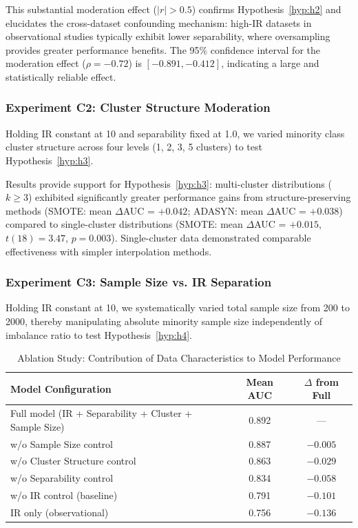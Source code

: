 \documentclass[12pt,a4paper]{article}
\theoremstyle{definition}
\begin{document}
This substantial moderation effect ($|r| > 0.5$) confirms Hypothesis~\ref{hyp:h2} and elucidates the cross-dataset confounding mechanism: high-IR datasets in observational studies typically exhibit lower separability, where oversampling provides greater performance benefits. The 95\% confidence interval for the moderation effect ($\rho = -0.72$) is $[-0.891, -0.412]$, indicating a large and statistically reliable effect.

\subsubsection{Experiment C2: Cluster Structure Moderation}
Holding IR constant at 10 and separability fixed at 1.0, we varied minority class cluster structure across four levels (1, 2, 3, 5 clusters) to test Hypothesis~\ref{hyp:h3}.

Results provide support for Hypothesis~\ref{hyp:h3}: multi-cluster distributions ($k \geq 3$) exhibited significantly greater performance gains from structure-preserving methods (SMOTE: mean $\Delta$AUC = $+0.042$; ADASYN: mean $\Delta$AUC = $+0.038$) compared to single-cluster distributions (SMOTE: mean $\Delta$AUC = $+0.015$, $t(18) = 3.47$, $p = 0.003$). Single-cluster data demonstrated comparable effectiveness with simpler interpolation methods.

\subsubsection{Experiment C3: Sample Size vs. IR Separation}
Holding IR constant at 10, we systematically varied total sample size from 200 to 2000, thereby manipulating absolute minority sample size independently of imbalance ratio to test Hypothesis~\ref{hyp:h4}.

\begin{table}[!ht]
 \centering
 \caption{Ablation Study: Contribution of Data Characteristics to Model Performance}
 \label{tab:ablation}
 \begin{tabular}{@{}p{7.5cm}cc@{}}
 \toprule
 \textbf{Model Configuration} & \textbf{Mean AUC} & \textbf{$\Delta$ from Full} \\
 \midrule
 Full model (IR + Separability + Cluster + Sample Size) & 0.892 & --- \\
 \quad w/o Sample Size control & 0.887 & $-0.005$ \\
 \quad w/o Cluster Structure control & 0.863 & $-0.029$ \\
 \quad w/o Separability control & 0.834 & $-0.058$ \\
 \quad w/o IR control (baseline) & 0.791 & $-0.101$ \\
 \midrule
 IR only (observational) & 0.756 & $-0.136$ \\
 \bottomrule
 \end{tabular}
\end{table}
\end{document}
